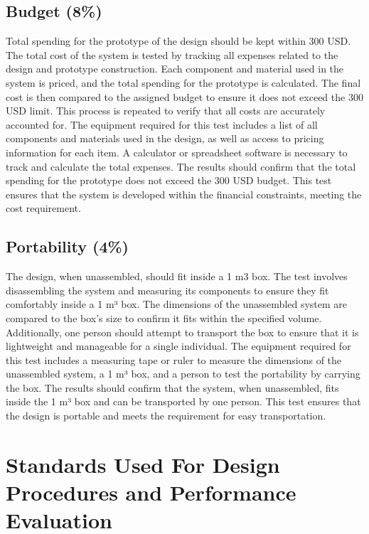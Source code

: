 \documentclass[12pt]{report}
\begin{document}
\subsection{Budget (8\%)}
Total spending for the prototype of the design should be kept within 300 USD. The total cost of the system is tested by tracking all expenses related to the design and prototype construction. Each component and material used in the system is priced, and the total spending for the prototype is calculated. The final cost is then compared to the assigned budget to ensure it does not exceed the 300 USD limit. This process is repeated to verify that all costs are accurately accounted for. The equipment required for this test includes a list of all components and materials used in the design, as well as access to pricing information for each item. A calculator or spreadsheet software is necessary to track and calculate the total expenses. The results should confirm that the total spending for the prototype does not exceed the 300 USD budget. This test ensures that the system is developed within the financial constraints, meeting the cost requirement.

\subsection{Portability (4\%)}
The design, when unassembled, should fit inside a 1 m3 box. The test involves disassembling the system and measuring its components to ensure they fit comfortably inside a 1 m³ box. The dimensions of the unassembled system are compared to the box's size to confirm it fits within the specified volume. Additionally, one person should attempt to transport the box to ensure that it is lightweight and manageable for a single individual. The equipment required for this test includes a measuring tape or ruler to measure the dimensions of the unassembled system, a 1 m³ box, and a person to test the portability by carrying the box. The results should confirm that the system, when unassembled, fits inside the 1 m³ box and can be transported by one person. This test ensures that the design is portable and meets the requirement for easy transportation.

\section{Standards Used For Design Procedures and Performance Evaluation }
\end{document}
